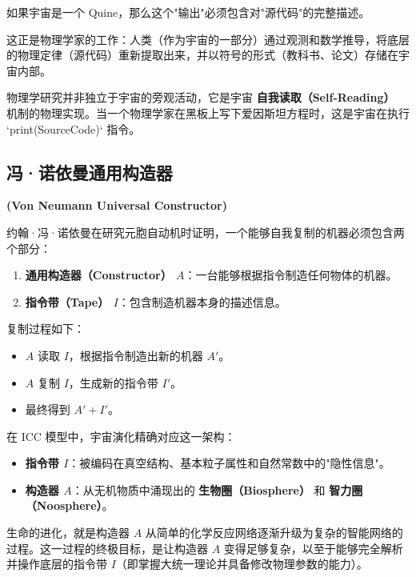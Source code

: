 如果宇宙是一个 Quine，那么这个"输出"必须包含对"源代码"的完整描述。

这正是物理学家的工作：人类（作为宇宙的一部分）通过观测和数学推导，将底层的物理定律（源代码）重新提取出来，并以符号的形式（教科书、论文）存储在宇宙内部。

\begin{corollary}[物理学的本体论功能]
物理学研究并非独立于宇宙的旁观活动，它是宇宙 \textbf{自我读取（Self-Reading）} 机制的物理实现。当一个物理学家在黑板上写下爱因斯坦方程时，这是宇宙在执行 `print(SourceCode)` 指令。
\end{corollary}

\subsection{冯·诺依曼通用构造器}

\textbf{(Von Neumann Universal Constructor)}

约翰·冯·诺依曼在研究元胞自动机时证明，一个能够自我复制的机器必须包含两个部分：

\begin{enumerate}
\item \textbf{通用构造器（Constructor） $A$}：一台能够根据指令制造任何物体的机器。

\item \textbf{指令带（Tape） $I$}：包含制造机器本身的描述信息。
\end{enumerate}

复制过程如下：

\begin{itemize}
\item $A$ 读取 $I$，根据指令制造出新的机器 $A'$。

\item $A$ 复制 $I$，生成新的指令带 $I'$。

\item 最终得到 $A' + I'$。
\end{itemize}

在 ICC 模型中，宇宙演化精确对应这一架构：

\begin{itemize}
\item \textbf{指令带 $I$}：被编码在真空结构、基本粒子属性和自然常数中的"隐性信息"。

\item \textbf{构造器 $A$}：从无机物质中涌现出的 \textbf{生物圈（Biosphere）} 和 \textbf{智力圈（Noosphere）}。
\end{itemize}

生命的进化，就是构造器 $A$ 从简单的化学反应网络逐渐升级为复杂的智能网络的过程。这一过程的终极目标，是让构造器 $A$ 变得足够复杂，以至于能够完全解析并操作底层的指令带 $I$（即掌握大统一理论并具备修改物理参数的能力）。

